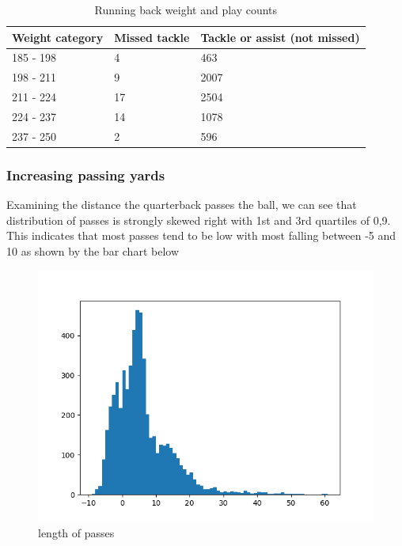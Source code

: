\documentclass[bibtex, sigconf, hyperref={colorlinks=true,linkcolor=blue,urlcolor=blue}]{acmart}
\begin{document}
\begin{table}[H]
  \caption{Running back weight and play counts}
  \label{tab:freq}
  \begin{tabular}{lll}
    \toprule
    Weight category & Missed tackle & Tackle or assist (not missed) \\
    \midrule
    185 - 198 & 4 & 463 \\
    198 - 211 & 9 & 2007 \\
    211 - 224 & 17 & 2504 \\
    224 - 237 & 14 & 1078 \\
    237 - 250 & 2 & 596 \\
  \end{tabular}
\end{table}

\subsubsection{Increasing passing yards}

Examining the distance the quarterback passes the ball, we can see that
distribution of passes is strongly skewed right with 1st and 3rd quartiles of 0,9.
This indicates that most passes tend to be low with most falling between -5 and
10 as shown by the bar chart below
\begin{figure}[h]
  \centering
  \includegraphics[width=\linewidth]{passlength}
  \caption{length of passes}
\end{figure}
\end{document}

